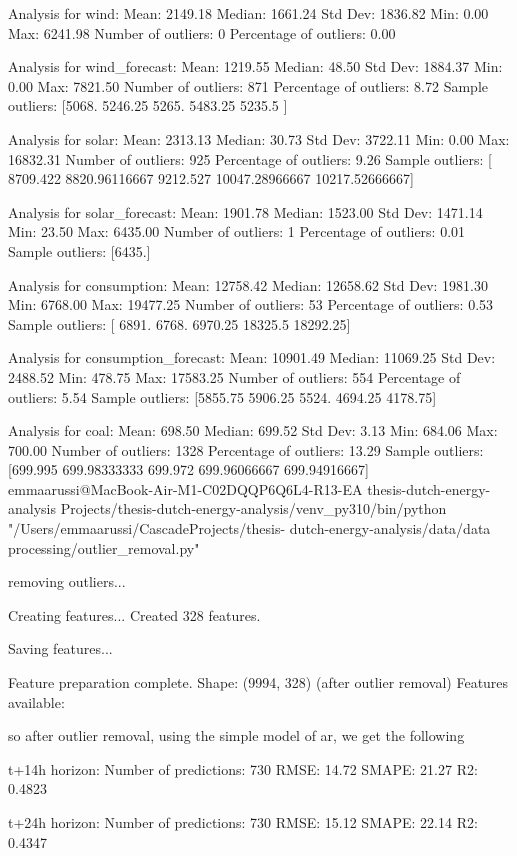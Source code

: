 Analysis for wind:
Mean: 2149.18
Median: 1661.24
Std Dev: 1836.82
Min: 0.00
Max: 6241.98
Number of outliers: 0
Percentage of outliers: 0.00%

Analysis for wind_forecast:
Mean: 1219.55
Median: 48.50
Std Dev: 1884.37
Min: 0.00
Max: 7821.50
Number of outliers: 871
Percentage of outliers: 8.72%
Sample outliers: [5068.   5246.25 5265.   5483.25 5235.5 ]

Analysis for solar:
Mean: 2313.13
Median: 30.73
Std Dev: 3722.11
Min: 0.00
Max: 16832.31
Number of outliers: 925
Percentage of outliers: 9.26%
Sample outliers: [ 8709.422       8820.96116667  9212.527      10047.28966667
 10217.52666667]

Analysis for solar_forecast:
Mean: 1901.78
Median: 1523.00
Std Dev: 1471.14
Min: 23.50
Max: 6435.00
Number of outliers: 1
Percentage of outliers: 0.01%
Sample outliers: [6435.]

Analysis for consumption:
Mean: 12758.42
Median: 12658.62
Std Dev: 1981.30
Min: 6768.00
Max: 19477.25
Number of outliers: 53
Percentage of outliers: 0.53%
Sample outliers: [ 6891.    6768.    6970.25 18325.5  18292.25]

Analysis for consumption_forecast:
Mean: 10901.49
Median: 11069.25
Std Dev: 2488.52
Min: 478.75
Max: 17583.25
Number of outliers: 554
Percentage of outliers: 5.54%
Sample outliers: [5855.75 5906.25 5524.   4694.25 4178.75]

Analysis for coal:
Mean: 698.50
Median: 699.52
Std Dev: 3.13
Min: 684.06
Max: 700.00
Number of outliers: 1328
Percentage of outliers: 13.29%
Sample outliers: [699.995      699.98333333 699.972      699.96066667 699.94916667]
emmaarussi@MacBook-Air-M1-C02DQQP6Q6L4-R13-EA thesis-dutch-energy-analysis %
Projects/thesis-dutch-energy-analysis/venv_py310/bin/python "/Users/emmaarussi/CascadeProjects/thesis-
dutch-energy-analysis/data/data processing/outlier_removal.py"

removing outliers...

Creating features...
Created 328 features.

Saving features...

Feature preparation complete. Shape: (9994, 328) (after outlier removal)
Features available: 

so after outlier removal, using the simple model of ar, we get the following

t+14h horizon:
Number of predictions: 730
RMSE: 14.72
SMAPE: 21.27%
R2: 0.4823

t+24h horizon:
Number of predictions: 730
RMSE: 15.12
SMAPE: 22.14%
R2: 0.4347

